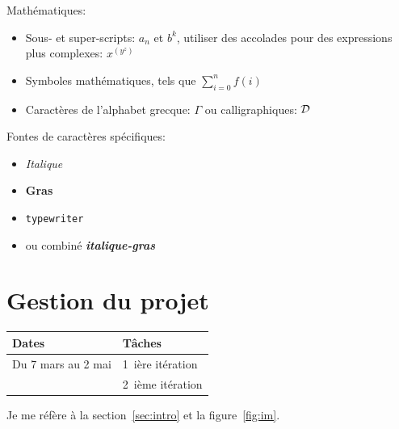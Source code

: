 \documentclass{article}
\begin{document}
Mathématiques:
\begin{itemize}
\item Sous- et super-scripts: $a_n$ et $b^k$, utiliser des accolades
  pour des expressions plus complexes: $x^{(y^z)}$

\item Symboles mathématiques, tels que $\sum_{i=0}^{n} f(i)$

\item Caractères de l'alphabet grecque: $\Gamma$ ou calligraphiques: ${\cal D}$
\end{itemize}

Fontes de caractères spécifiques:
\begin{itemize}
\item \emph{Italique}
\item \textbf{Gras}
\item \texttt{typewriter}
\item ou combiné \emph{\textbf{italique-gras}}
\end{itemize}

\section{Gestion du projet}

\begin{tabular}[h]{|l|l|}
\hline
Dates & Tâches \\
\hline
\hline
Du 7 mars au 2 mai & 1~ière itération \\
                   & 2~ième itération \\
\hline
\end{tabular}

Je me réfère à la section~\ref{sec:intro} et la figure~\ref{fig:im}.



\end{document}
